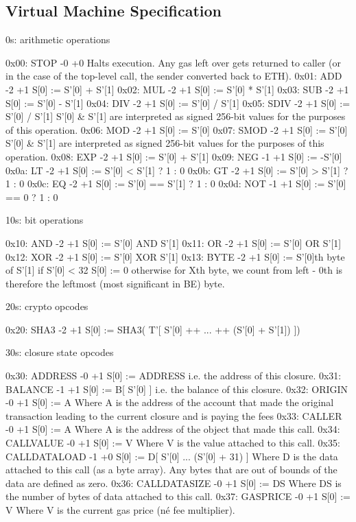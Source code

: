 \documentclass[9pt,oneside]{amsart}
\begin{document}
\begin{multicols}{2}
\section{Virtual Machine Specification}\label{app:vm}

0s: arithmetic operations

0x00: STOP -0 +0
Halts execution.
Any gas left over gets returned to caller (or in the case of the top-level call, the sender converted back to ETH).
0x01: ADD -2 +1
S[0] := S'[0] + S'[1]
0x02: MUL -2 +1
S[0] := S'[0] * S'[1]
0x03: SUB -2 +1
S[0] := S'[0] - S'[1]
0x04: DIV -2 +1
S[0] := S'[0] / S'[1]
0x05: SDIV -2 +1
S[0] := S'[0] / S'[1]
S'[0] \& S'[1] are interpreted as signed 256-bit values for the purposes of this operation.
0x06: MOD -2 +1
S[0] := S'[0] %
0x07: SMOD -2 +1
S[0] := S'[0] %
S'[0] \& S'[1] are interpreted as signed 256-bit values for the purposes of this operation.
0x08: EXP -2 +1
S[0] := S'[0] + S'[1]
0x09: NEG -1 +1
S[0] := -S'[0]
0x0a: LT -2 +1
S[0] := S'[0] < S'[1] ? 1 : 0
0x0b: GT -2 +1
S[0] := S'[0] > S'[1] ? 1 : 0
0x0c: EQ -2 +1
S[0] := S'[0] == S'[1] ? 1 : 0
0x0d: NOT -1 +1
S[0] := S'[0] == 0 ? 1 : 0

10s: bit operations

0x10: AND -2 +1
S[0] := S'[0] AND S'[1]
0x11: OR -2 +1
S[0] := S'[0] OR S'[1]
0x12: XOR -2 +1
S[0] := S'[0] XOR S'[1]
0x13: BYTE -2 +1
S[0] := S'[0]th byte of S'[1]
if S'[0] < 32
S[0] := 0
otherwise
for Xth byte, we count from left - 0th is therefore the leftmost (most significant in BE) byte.

20s: crypto opcodes

0x20: SHA3 -2 +1
S[0] := SHA3( T'[ S'[0] ++ ... ++ (S'[0] + S'[1]) ])

30s: closure state opcodes

0x30: ADDRESS -0 +1
S[0] := ADDRESS
i.e. the address of this closure.
0x31: BALANCE -1 +1
S[0] := B[ S'[0] ]
i.e. the balance of this closure.
0x32: ORIGIN -0 +1
S[0] := A
Where A is the address of the account that made the original transaction leading to the current closure and is paying the fees
0x33: CALLER -0 +1
S[0] := A
Where A is the address of the object that made this call.
0x34: CALLVALUE -0 +1
S[0] := V
Where V is the value attached to this call.
0x35: CALLDATALOAD -1 +0
S[0] := D[ S'[0] ... (S'[0] + 31) ]
Where D is the data attached to this call (as a byte array).
Any bytes that are out of bounds of the data are defined as zero.
0x36: CALLDATASIZE -0 +1
S[0] := DS
Where DS is the number of bytes of data attached to this call.
0x37: GASPRICE -0 +1
S[0] := V
Where V is the current gas price (né fee multiplier).


\end{multicols}
\end{document}
